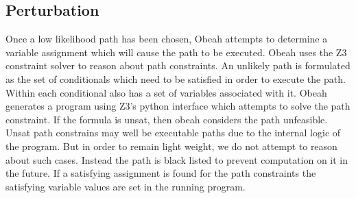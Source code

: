 \subsection{Perturbation}
\label{sec:runtime-pertubation}

Once a low likelihood path has been chosen, Obeah attempts to determine a
variable assignment which will cause the path to be executed. Obeah uses the Z3
constraint solver to reason about path constraints. An unlikely path is
formulated as the set of conditionals which need to be satisfied in order to
execute the path. Within each conditional also has a set of variables
associated with it. Obeah generates a program using Z3's python interface which
attempts to solve the path constraint. If the formula is unsat, then obeah
considers the path unfeasible. Unsat path constrains may well be executable
paths due to the internal logic of the program. But in order to remain light
weight, we do not attempt to reason about such cases. Instead the path is black
listed to prevent computation on it in the future. If a satisfying assignment
is found for the path constraints the satisfying variable values are set in the
running program.



